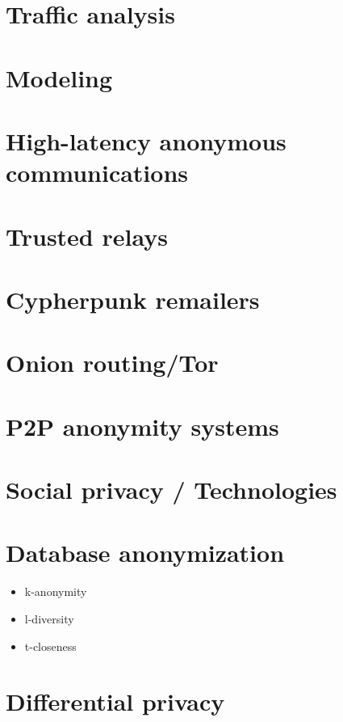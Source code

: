 \documentclass[a4paper,12pt,dutch]{article}
\begin{document}
\section{Traffic analysis}

\section{Modeling}

\section{High-latency anonymous communications}

\section{Trusted relays}

\section{Cypherpunk remailers}

\section{Onion routing/Tor}

\section{P2P anonymity systems}

\section{Social privacy / Technologies} %

\section{Database anonymization}
\begin{itemize}
	\item k-anonymity
	\item l-diversity
	\item t-closeness
\end{itemize}

\section{Differential privacy}
\end{document}
